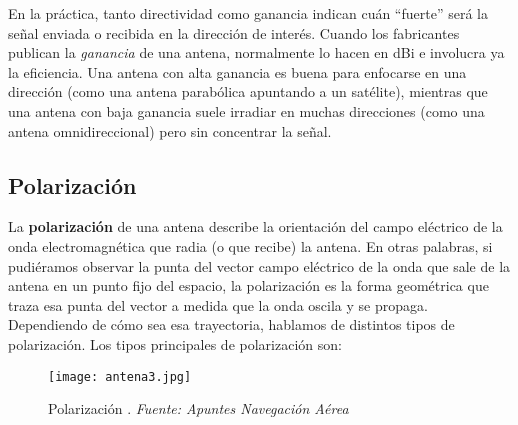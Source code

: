 En la práctica, tanto directividad como ganancia indican cuán “fuerte” será la señal enviada o recibida en la dirección de interés. Cuando los fabricantes publican la \emph{ganancia} de una antena, normalmente lo hacen en dBi e involucra ya la eficiencia. Una antena con alta ganancia es buena para enfocarse en una dirección (como una antena parabólica apuntando a un satélite), mientras que una antena con baja ganancia suele irradiar en muchas direcciones (como una antena omnidireccional) pero sin concentrar la señal.

\subsection{Polarización}

La \textbf{polarización} de una antena describe la orientación del campo eléctrico de la onda electromagnética que radia (o que recibe) la antena. En otras palabras, si pudiéramos observar la punta del vector campo eléctrico de la onda que sale de la antena en un punto fijo del espacio, la polarización es la forma geométrica que traza esa punta del vector a medida que la onda oscila y se propaga. Dependiendo de cómo sea esa trayectoria, hablamos de distintos tipos de polarización. Los tipos principales de polarización son:\\

\begin{figure}[H]
    \centering
    \texttt{[image: antena3.jpg]}
    \caption{\centering Polarización .\textit{ Fuente: Apuntes Navegación Aérea}}
\end{figure}

